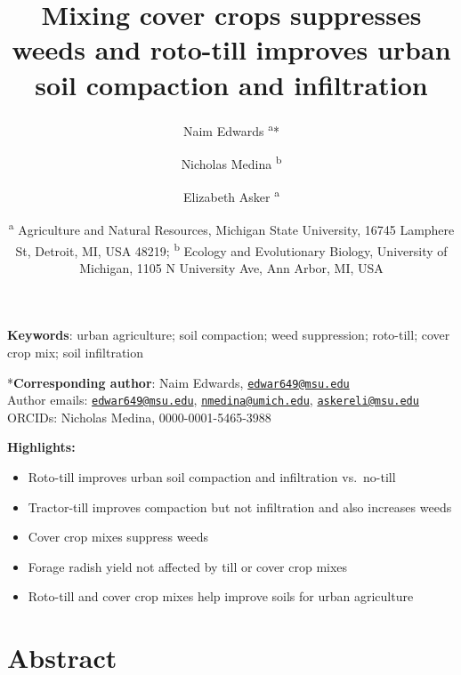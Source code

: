 \documentclass[
  12pt,
]{article}
\title{Mixing cover crops suppresses weeds and roto-till improves urban soil compaction and infiltration}
\author{Naim Edwards \textsuperscript{a}* \and Nicholas Medina \textsuperscript{b} \and Elizabeth Asker \textsuperscript{a}}
\date{\scriptsize \textsuperscript{a} Agriculture and Natural Resources, Michigan State University, 16745 Lamphere St, Detroit, MI, USA 48219; \textsuperscript{b} Ecology and Evolutionary Biology, University of Michigan, 1105 N University Ave, Ann Arbor, MI, USA}
\begin{document}
\maketitle

\hfill\break
\hfill\break

\textbf{Keywords}: urban agriculture; soil compaction; weed suppression; roto-till; cover crop mix; soil infiltration

\hfill\break
\hfill\break

*\textbf{Corresponding author}: Naim Edwards, \href{mailto:edwar649@msu.edu}{\nolinkurl{edwar649@msu.edu}}\\
Author emails: \href{mailto:edwar649@msu.edu}{\nolinkurl{edwar649@msu.edu}}, \href{mailto:nmedina@umich.edu}{\nolinkurl{nmedina@umich.edu}}, \href{mailto:askereli@msu.edu}{\nolinkurl{askereli@msu.edu}}\\
ORCIDs: Nicholas Medina, 0000-0001-5465-3988

\newpage

\textbf{Highlights:}

\begin{itemize}
\item
  Roto-till improves urban soil compaction and infiltration vs.~no-till
\item
  Tractor-till improves compaction but not infiltration and also increases weeds
\item
  Cover crop mixes suppress weeds
\item
  Forage radish yield not affected by till or cover crop mixes
\item
  Roto-till and cover crop mixes help improve soils for urban agriculture
\end{itemize}

\newpage

\hypertarget{abstract}{%
\section*{Abstract}\label{abstract}}
\end{document}
